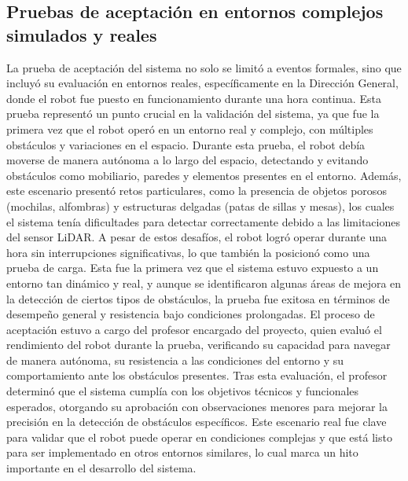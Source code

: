 \subsection{Pruebas de aceptaci\'on en entornos complejos simulados y reales}

    La prueba de aceptaci\'on del sistema no solo se limit\'o a eventos formales, 
        sino que incluy\'o su evaluaci\'on en entornos reales, espec\'ificamente en 
        la Direcci\'on General, donde el robot fue puesto en funcionamiento durante 
        una hora continua. Esta prueba represent\'o un punto crucial en la validaci\'on 
        del sistema, ya que fue la primera vez que el robot oper\'o en un entorno real 
        y complejo, con m\'ultiples obst\'aculos y variaciones en el espacio.
    \vskip 0.5cm
    Durante esta prueba, el robot deb\'ia moverse de manera aut\'onoma a lo largo del espacio, 
        detectando y evitando obst\'aculos como mobiliario, paredes y elementos presentes en 
        el entorno. Adem\'as, este escenario present\'o retos particulares, como la presencia 
        de objetos porosos (mochilas, alfombras) y estructuras delgadas (patas de sillas y mesas), 
        los cuales el sistema ten\'ia dificultades para detectar correctamente debido a las 
        limitaciones del sensor LiDAR.
    \vskip 0.5cm
    A pesar de estos desaf\'ios, el robot logr\'o operar durante una hora sin interrupciones 
        significativas, lo que tambi\'en la posicion\'o como una prueba de carga. Esta fue 
        la primera vez que el sistema estuvo expuesto a un entorno tan din\'amico y real, 
        y aunque se identificaron algunas \'areas de mejora en la detecci\'on de ciertos tipos 
        de obst\'aculos, la prueba fue exitosa en t\'erminos de desempe\~no general y resistencia 
        bajo condiciones prolongadas.
    \vskip 0.5cm
    El proceso de aceptaci\'on estuvo a cargo del profesor encargado del proyecto, quien evalu\'o el 
        rendimiento del robot durante la prueba, verificando su capacidad para navegar de manera 
        aut\'onoma, su resistencia a las condiciones del entorno y su comportamiento ante los obst\'aculos 
        presentes. Tras esta evaluaci\'on, el profesor determin\'o que el sistema cumpl\'ia con los objetivos 
        t\'ecnicos y funcionales esperados, otorgando su aprobaci\'on con observaciones menores para mejorar 
        la precisi\'on en la detecci\'on de obst\'aculos espec\'ificos.
    \vskip 0.5cm
    Este escenario real fue clave para validar que el robot puede operar en condiciones complejas y que est\'a 
        listo para ser implementado en otros entornos similares, lo cual marca un hito importante en el 
        desarrollo del sistema.